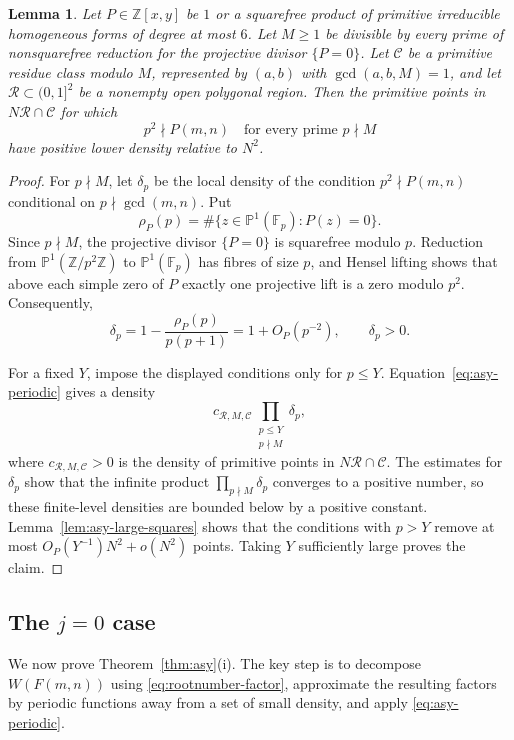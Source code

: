 \documentclass[12pt,reqno]{amsart}
\numberwithin{equation}{section}
\newtheorem{lemma}[theorem]{Lemma}
\theoremstyle{definition}
\renewcommand{\le}{\leqslant}
\renewcommand{\ge}{\geqslant}
\newcommand{\PP}{\mathbb{P}}
\newcommand{\FF}{\mathbb{F}}
\newcommand{\ZZ}{\mathbb{Z}}
\newcommand{\rw}{W}
\begin{document}
\newpage
\begin{lemma}\label{lem:squarefree-class-density}
Let $P\in\ZZ[x,y]$ be $1$ or a squarefree product of primitive irreducible homogeneous forms of degree at most $6$.
Let $M\ge1$ be divisible by every prime of nonsquarefree reduction for the projective divisor $\{P=0\}$.
Let $\mathcal C$ be a primitive residue class modulo $M$, represented by $(a,b)$ with $\gcd(a,b,M)=1$, and let $\mathcal R\subset(0,1]^2$ be a nonempty open polygonal region.
Then the primitive points in $N\mathcal R\cap\mathcal C$ for which
\[
p^2\nmid P(m,n)\quad\text{for every prime }p\nmid M
\]
have positive lower density relative to $N^2$.
\end{lemma}

\begin{proof}
For $p\nmid M$, let $\delta_p$ be the local density of the condition $p^2\nmid P(m,n)$ conditional on $p\nmid\gcd(m,n)$.
Put
\[
\rho_P(p)=\#\{z\in\PP^1(\FF_p):P(z)=0\}.
\]
Since $p\nmid M$, the projective divisor $\{P=0\}$ is squarefree modulo $p$.
Reduction from $\PP^1(\ZZ/p^2\ZZ)$ to $\PP^1(\FF_p)$ has fibres of size $p$, and Hensel lifting shows that above each simple zero of $P$ exactly one projective lift is a zero modulo $p^2$.
Consequently,
\[
\delta_p
=1-\frac{\rho_P(p)}{p(p+1)}
=1+O_P(p^{-2}),
\qquad
\delta_p>0.
\]

For a fixed $Y$, impose the displayed conditions only for $p\le Y$.
Equation~\eqref{eq:asy-periodic} gives a density
\[
c_{\mathcal R,M,\mathcal C}
\prod_{\substack{p\le Y\\p\nmid M}}\delta_p,
\]
where $c_{\mathcal R,M,\mathcal C}>0$ is the density of primitive points in $N\mathcal R\cap\mathcal C$.
The estimates for $\delta_p$ show that the infinite product $\prod_{p\nmid M}\delta_p$ converges to a positive number, so these finite-level densities are bounded below by a positive constant.
Lemma~\ref{lem:asy-large-squares} shows that the conditions with $p>Y$ remove at most $O_P(Y^{-1})N^2+o(N^2)$ points.
Taking $Y$ sufficiently large proves the claim.
\end{proof}

\subsection{The \texorpdfstring{$j=0$}{j=0} case}

We now prove Theorem~\ref{thm:asy}(i).
The key step is to decompose $\rw(F(m,n))$ using \eqref{eq:rootnumber-factor}, approximate the resulting factors by periodic functions away from a set of small density, and apply \eqref{eq:asy-periodic}.
\end{document}
